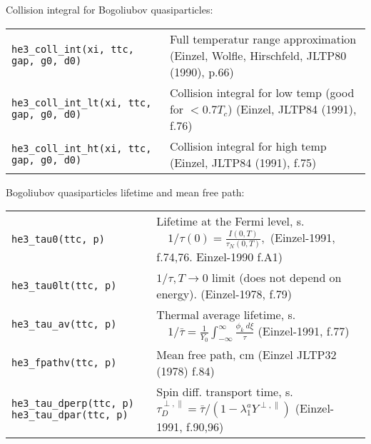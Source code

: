 \documentclass[a4paper]{article}
\begin{document}
\medskip

Collision integral for Bogoliubov quasiparticles:

\medskip
\noindent\begin{tabular}{lp{11cm}}
\tt he3\_coll\_int(xi, ttc, gap, g0, d0) &
   Full temperatur range approximation\newline
   {\small (Einzel, Wolfle, Hirschfeld, JLTP80 (1990), p.66)}\\
\tt he3\_coll\_int\_lt(xi, ttc, gap, g0, d0) &
   Collision integral for low temp (good for $< 0.7 T_c$)\newline
   {\small (Einzel, JLTP84 (1991), f.76)}\\
\tt he3\_coll\_int\_ht(xi, ttc, gap, g0, d0) &
   Collision integral for high temp\newline
   {\small (Einzel, JLTP84 (1991), f.75)}\\
\end{tabular}
\medskip

Bogoliubov quasiparticles lifetime and mean free path:

\medskip
\noindent\begin{tabular}{p{4cm}p{11cm}}
\tt he3\_tau0(ttc, p)      & Lifetime at the Fermi level, s.
                           $\displaystyle\quad 1/\tau(0) = \frac{I (0,T)}{\tau_N(0,T)},$\newline
                            {\small(Einzel-1991, f.74,76. Einzel-1990 f.A1)}\\

\tt he3\_tau0lt(ttc, p)    & $\displaystyle 1/\tau, T\rightarrow0$ limit (does not depend on energy).
                            {\small(Einzel-1978, f.79)}\\
\tt he3\_tau\_av(ttc, p)   & Thermal average lifetime, s.
                           $\displaystyle\quad 1/\bar\tau = \frac{1}{Y_0}
                           \int_{-\infty}^{\infty} \frac{\phi_k\ d\xi}{\tau}$\newline
                            {\small(Einzel-1991, f.77)}\\
\tt he3\_fpathv(ttc, p)    & Mean free path, cm\newline
                             {\small (Einzel JLTP32 (1978) f.84)}\\

\tt he3\_tau\_dperp(ttc, p)\newline
\tt he3\_tau\_dpar(ttc, p)  & Spin diff. transport time, s.
                           \ $\tau_D^{\perp,\parallel} = \bar\tau
                            /(1-\lambda_1^a Y^{\perp,\parallel})$\newline
                            {\small(Einzel-1991, f.90,96)}\\
\end{tabular}
\medskip
\end{document}
